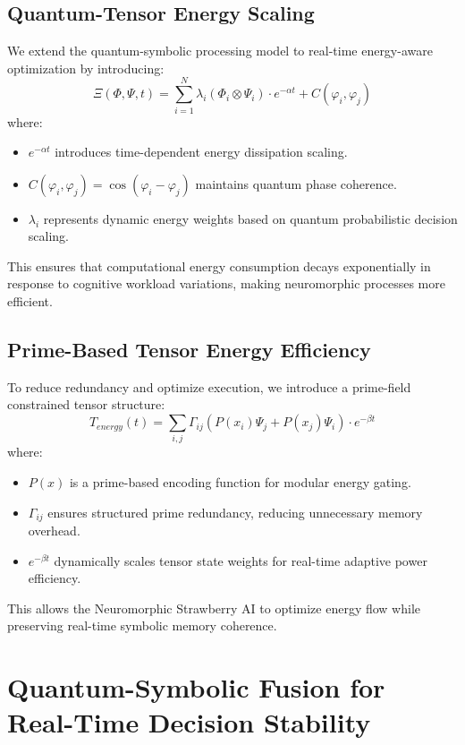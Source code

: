 \documentclass{article}
\theoremstyle{plain}
\begin{document}
\subsection{Quantum-Tensor Energy Scaling}
We extend the quantum-symbolic processing model to real-time energy-aware optimization by introducing:
\begin{equation}
    \Xi(\Phi, \Psi, t) = \sum_{i=1}^{N} \lambda_i (\Phi_i \otimes \Psi_i) \cdot e^{-\alpha t} + C(\varphi_i, \varphi_j)
\end{equation}
where:
\begin{itemize}
    \item \( e^{-\alpha t} \) introduces time-dependent energy dissipation scaling.
    \item \( C(\varphi_i, \varphi_j) = \cos(\varphi_i - \varphi_j) \) maintains quantum phase coherence.
    \item \( \lambda_i \) represents dynamic energy weights based on quantum probabilistic decision scaling.
\end{itemize}
This ensures that computational energy consumption decays exponentially in response to cognitive workload variations, making neuromorphic processes more efficient.

\subsection{Prime-Based Tensor Energy Efficiency}
To reduce redundancy and optimize execution, we introduce a prime-field constrained tensor structure:
\begin{equation}
    T_{energy}(t) = \sum_{i,j} \Gamma_{ij} (P(x_i) \Psi_j + P(x_j) \Psi_i) \cdot e^{-\beta t}
\end{equation}
where:
\begin{itemize}
    \item \( P(x) \) is a prime-based encoding function for modular energy gating.
    \item \( \Gamma_{ij} \) ensures structured prime redundancy, reducing unnecessary memory overhead.
    \item \( e^{-\beta t} \) dynamically scales tensor state weights for real-time adaptive power efficiency.
\end{itemize}
This allows the Neuromorphic Strawberry AI to optimize energy flow while preserving real-time symbolic memory coherence.

\section{Quantum-Symbolic Fusion for Real-Time Decision Stability}
\end{document}
